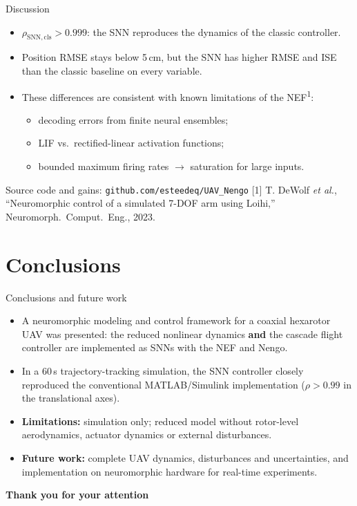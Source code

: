 \documentclass{beamer}
\newcommand{\slideref}[1]{\vfill{\tiny #1}}
\begin{document}
\begin{frame}{Discussion}
\begin{itemize}
    \item $\rho_{\mathrm{SNN,cls}} > 0.999$: the SNN reproduces the dynamics of the classic controller.
    \vspace{0.2cm}
    \item Position RMSE stays below 5\,cm, but the SNN has higher RMSE and ISE than the classic baseline on every variable.
    \vspace{0.2cm}
    \item These differences are consistent with known limitations of the NEF\textsuperscript{1}:
    \begin{itemize}
        \item decoding errors from finite neural ensembles;
        \item LIF vs.\ rectified-linear activation functions;
        \item bounded maximum firing rates $\rightarrow$ saturation for large inputs.
    \end{itemize}
\end{itemize}
\vspace{0.3cm}
\small Source code and gains: \texttt{github.com/esteedeq/UAV\_Nengo}
\slideref{[1] T. DeWolf \emph{et al.}, ``Neuromorphic control of a simulated 7-DOF arm using Loihi,'' Neuromorph.\ Comput.\ Eng., 2023.}
\end{frame}

\section{Conclusions}

\begin{frame}{Conclusions and future work}
\begin{itemize}
    \item A neuromorphic modeling and control framework for a coaxial hexarotor UAV was presented: the reduced nonlinear dynamics \textbf{and} the cascade flight controller are implemented as SNNs with the NEF and Nengo.
    \vspace{0.2cm}
    \item In a 60\,s trajectory-tracking simulation, the SNN controller closely reproduced the conventional MATLAB/Simulink implementation ($\rho > 0.99$ in the translational axes).
    \vspace{0.2cm}
    \item \textbf{Limitations:} simulation only; reduced model without rotor-level aerodynamics, actuator dynamics or external disturbances.
    \vspace{0.2cm}
    \item \textbf{Future work:} complete UAV dynamics, disturbances and uncertainties, and implementation on neuromorphic hardware for real-time experiments.
\end{itemize}
\end{frame}

\begin{frame}
    \begin{center}
    \textbf{\Huge Thank you for your attention}
    \end{center}
\end{frame}
\end{document}
